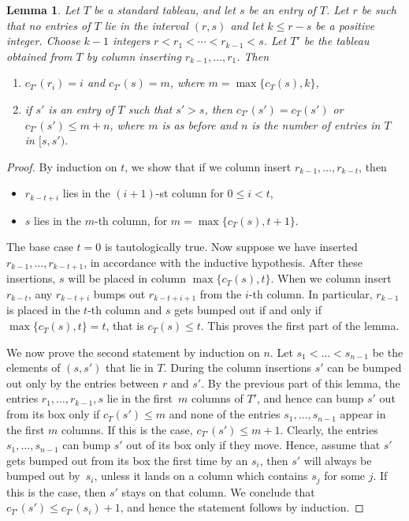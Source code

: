 \documentclass[pdftex]{sigma}
\numberwithin{equation}{section}
\newtheorem{Lemma}[Theorem]{Lemma}
\begin{document}
\begin{Lemma}\label{lem:2.2}
Let $T$ be a standard tableau, and let $s$ be an entry of $T$. Let $r$ be such that no entries of $T$ lie in the interval $(r,s)$ and let $k\leq r-s$ be a positive integer. Choose $k-1$ integers $r<r_1<\cdots<r_{k-1}<s$. Let $T'$ be the tableau obtained from $T$ by column inserting $r_{k-1},\dots,r_1$. Then
\begin{enumerate}\itemsep=0pt
\item[$1)$] $c_{T'}(r_i)=i$ and $c_{T'}(s)=m$, where $m=\max\{c_T(s),k\}$,
\item[$2)$] if $s'$ is an entry of $T$ such that $s'>s$, then $c_{T'}(s')=c_T(s')$ or $c_{T'}(s')\leq m+n$, where $m$ is as before and $n$ is the number of entries in $T$ in $[s,s')$.
\end{enumerate}
\end{Lemma}
\begin{proof}
 By induction on $t$, we show that if we column insert $r_{k-1}, \dots, r_{k-t}$, then
\begin{itemize}\itemsep=0pt
\item $r_{k-t+i}$ lies in the $(i+1)$-st column for $0\leq i<t$,
\item $s$ lies in the $m$-th column, for $m=\max\{c_T(s),t+1\}$.
\end{itemize}
The base case $t=0$ is tautologically true. Now suppose we have inserted $r_{k-1}, \dots, r_{k-t+1}$, in accordance with the inductive hypothesis. After these insertions, $s$ will be placed in column $\max\{c_T(s),t\}$. When we column insert $r_{k-t}$, any $r_{k-t+i}$ bumps out $r_{k-t+i+1}$ from the $i$-th column. In particular, $r_{k-1}$ is placed in the $t$-th column and $s$ gets bumped out if and only if $\max\{c_T(s),t\}=t$, that is $c_T(s)\leq t$. This proves the first part of the lemma.


 We now prove the second statement by induction on $n$. Let $s_1<\dots<s_{n-1}$ be the elements of $(s,s')$ that lie in $T$.
 During the column insertions $s'$ can be bumped out only by the entries between $r$ and $s'$. By the previous part of this lemma, the entries $r_1, \dots,r_{k-1}, s$ lie in the first~$m$ columns of $T'$, and hence can bump $s'$ out from its box only if $c_{T}(s')\leq m$ and none of the entries $s_1, \dots, s_{n-1}$ appear in the first $m$ columns. If this is the case, $c_{T'}(s')\leq m+1$. Clearly, the entries $s_1,\dots,s_{n-1}$ can bump $s'$ out of its box only if they move. Hence, assume that $s'$ gets bumped out from its box the first time by an $s_i$, then $s'$ will always be bumped out by~$s_i$, unless it lands on a column which contains $s_j$ for some $j$. If this is the case, then $s'$ stays on that column. We conclude that $c_{T'}(s')\leq c_{T'}(s_{i})+1$, and hence the statement follows by induction.
\end{proof}
\end{document}
